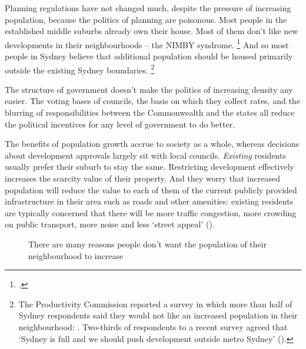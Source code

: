 Planning regulations have not changed much, despite the pressure of increasing population, because the politics of planning are poisonous.
Most people in the established middle suburbs already own their house.
Most of them don't like new developments in their neighbourhoods -- the NIMBY syndrome.%
	\footcites{Visentin-2017-SMH-Housing-afford-lessons-from-Vancouver}{Robertson-2017-SMH-Sydenham-Bankstown-redevelop-study-developers-could-add-25k-homes}
And so most people in Sydney believe that additional population should be housed primarily outside the existing Sydney boundaries.%
	\footnote{The Productivity Commission reported a survey in which more than half of Sydney respondents said they would not like an increased population in their neighbourhood: \textcite[][28]{PC2011PerformanceBenchmark}.
	Two-thirds of respondents to a recent survey agreed that `Sydney is full and we should push development outside metro Sydney' (\textcite{Nicholls-SMH-2017-survey-city-is-full}).}

The structure of government doesn't make the politics of increasing density any easier.
The voting bases of councils, the basis on which they collect rates, and the blurring of responsibilities between the Commonwealth and the states all reduce the political incentives for any level of government to do better.

The benefits of population growth accrue to society as a whole, whereas decisions about development approvals largely sit with local councils. 
\emph{Existing} residents usually prefer their suburb to stay the same.
Restricting development effectively increases the scarcity value of their property.
And they worry that increased population will reduce the value to each of them of the current publicly provided infrastructure in their area such as roads and other amenities: existing residents are typically concerned that there will be more traffic congestion, more crowding on public transport, more noise and less `street appeal' ().

\begin{figure}
\caption{There are many reasons people don't want the population of their neighbourhood to increase}\label{fig:reasons-dont-want-pop-growth}
%
{\textcite[][28]{PC2011PerformanceBenchmark}}
\end{figure}

